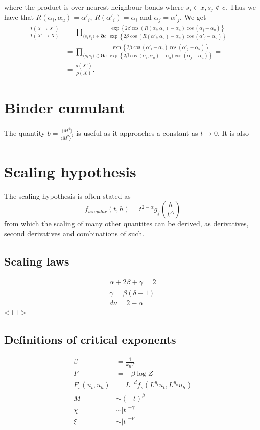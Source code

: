 \documentclass[a4paper]{article}
\begin{document}
where the product is over nearest neighbour bonds where $s_i \in x, s_j \notin c$.
Thus we have that $ R(\alpha_i,\alpha_u) = \alpha'_i $, $R(\alpha'_i) = \alpha_i$ and $\alpha_j = \alpha'_j$.
We get
\begin{align}
  \frac{T(X\rightarrow X')}{T(X'\rightarrow X)}&= \prod_{\langle s_i s_j \rangle \in \bm{\partial} c} \frac{ \exp\left\{2\beta\cos(R(\alpha_i,\alpha_u) - \alpha_u)\cos(\alpha_j - \alpha_u)\right\}}{ \exp\left\{2\beta\cos(R(\alpha'_i,\alpha_u) - \alpha_u)\cos(\alpha'_j -\alpha_u)\right\}} = \\
  &= \prod_{\langle s_i s_j \rangle \in \bm{\partial} c} \frac{ \exp\left\{2\beta\cos(\alpha'_i - \alpha_u)\cos(\alpha'_j - \alpha_u)\right\}}{ \exp\left\{2\beta\cos(\alpha_i,\alpha_u) - \alpha_u)\cos(\alpha_j -\alpha_u)\right\}} = \\
  &= \frac{\rho(X')}{\rho(X)}.
\end{align}



\section{Binder cumulant}
The quantity $b =\frac{\langle M^4 \rangle}{\langle M^2\rangle^2}$ is useful as it approaches a constant as $t\rightarrow 0 $. It is also  
\section{Scaling hypothesis}
The scaling hypothesis is often stated as
\begin{equation}
  f_{singular}(t,h) = t^{2- \alpha} g_f\left(\frac{h}{t^\Delta}\right)
  \label{}
\end{equation}
from which the scaling of many other quantites can be derived, as derivatives, second derivatives and combinations of such.
\subsection{Scaling laws}
\begin{align}
	\alpha + 2\beta + \gamma = 2\\
	\gamma = \beta(\delta -1)\\
	d\nu = 2 - \alpha
  \label{<++>}
\end{align}<++>
\subsection{Definitions of critical exponents}
\begin{align}
  \beta &= \frac{1}{k_B T} \\
  F &= -\beta \log Z\\
  F_s(u_t,u_h) &= L^{-d}f_s(L^{y_t}u_t,L^{y_h}u_h)\\
  M &\sim (-t)^{\beta}\\
  \chi &\sim |t|^{-\gamma}\\
  \xi &\sim |t|^{-\nu}
\end{align}  
\end{document}
